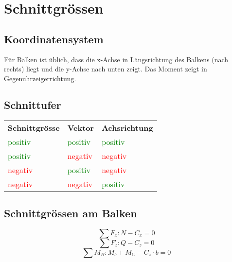 



\section{Schnittgrössen}

\subsection{Koordinatensystem}
Für Balken ist üblich, dass die x-Achse in Längsrichtung des Balkens (nach rechts) liegt und die y-Achse nach unten zeigt. Das Moment zeigt in Gegenuhrzeigerrichtung. 

\subsection{Schnittufer}
\begin{tabular}{lll}
\rowcolor{white} \textbf{Schnittgrösse} & \textbf{Vektor} & \textbf{Achsrichtung}\\
\rowcolor{lgray}
\textcolor{green} {positiv} & 
\textcolor{green} {positiv} & 
\textcolor{green} {positiv} \\
\rowcolor{white}
\textcolor{green} {positiv} & 
\textcolor{red}   {negativ} & 
\textcolor{red}   {negativ} \\
\rowcolor{lgray}
\textcolor{red}   {negativ} & 
\textcolor{green} {positiv} & 
\textcolor{red}   {negativ} \\
\rowcolor{white}
\textcolor{red}   {negativ} & 
\textcolor{red}   {negativ} & 
\textcolor{green} {positiv} 
\end{tabular}

\subsection{Schnittgrössen am Balken}
\[ \sum F_x: N - C_x = 0 \]
\[ \sum F_z: Q - C_z = 0 \]
\[ \sum M_B: M_b + M_C - C_z \cdot b = 0 \]

